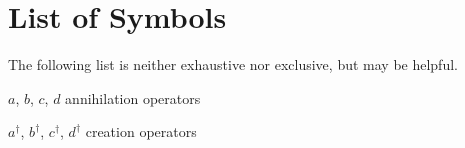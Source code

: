 \chapter{List of Symbols}


The following list is neither exhaustive nor exclusive, but may be helpful.
\begin{list}{}{%
\setlength{\labelwidth}{24mm}
\setlength{\leftmargin}{35mm}}
\item[$a$, $b$, $c$, $d$\dotfill] annihilation operators
\item[$a^\dagger$, $b^\dagger$, $c^\dagger$, $d^\dagger$\dotfill] creation
operators
\end{list}
